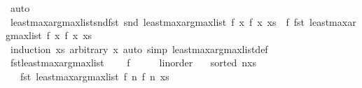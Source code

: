 \begin{isabellebody}
\isamarkupfalse%
\ auto%
\endisatagproof
{\isafoldproof}%
%
\isadelimproof
\isanewline
%
\endisadelimproof
\isanewline
{}\isamarkupfalse%
\ least{\isacharunderscore}{\kern0pt}max{\isacharunderscore}{\kern0pt}arg{\isacharunderscore}{\kern0pt}max{\isacharunderscore}{\kern0pt}list{\isacharunderscore}{\kern0pt}snd{\isacharunderscore}{\kern0pt}fst{\isacharcolon}{\kern0pt}\ {\isachardoublequoteopen}snd\ {\isacharparenleft}{\kern0pt}least{\isacharunderscore}{\kern0pt}max{\isacharunderscore}{\kern0pt}arg{\isacharunderscore}{\kern0pt}max{\isacharunderscore}{\kern0pt}list\ f\ {\isacharparenleft}{\kern0pt}x{\isacharcomma}{\kern0pt}\ f\ x{\isacharparenright}{\kern0pt}\ xs{\isacharparenright}{\kern0pt}\ {\isacharequal}{\kern0pt}\ f\ {\isacharparenleft}{\kern0pt}fst\ {\isacharparenleft}{\kern0pt}least{\isacharunderscore}{\kern0pt}max{\isacharunderscore}{\kern0pt}arg{\isacharunderscore}{\kern0pt}max{\isacharunderscore}{\kern0pt}list\ f\ {\isacharparenleft}{\kern0pt}x{\isacharcomma}{\kern0pt}\ f\ x{\isacharparenright}{\kern0pt}\ xs{\isacharparenright}{\kern0pt}{\isacharparenright}{\kern0pt}{\isachardoublequoteclose}\isanewline
%
\isadelimproof
\ \ %
\endisadelimproof
%
\isatagproof
{}\isamarkupfalse%
\ {\isacharparenleft}{\kern0pt}induction\ xs\ arbitrary{\isacharcolon}{\kern0pt}\ x{\isacharparenright}{\kern0pt}\ {\isacharparenleft}{\kern0pt}auto\ simp{\isacharcolon}{\kern0pt}\ least{\isacharunderscore}{\kern0pt}max{\isacharunderscore}{\kern0pt}arg{\isacharunderscore}{\kern0pt}max{\isacharunderscore}{\kern0pt}list{\isacharunderscore}{\kern0pt}def{\isacharparenright}{\kern0pt}%
\endisatagproof
{\isafoldproof}%
%
\isadelimproof
\isanewline
%
\endisadelimproof
\isanewline
{}\isamarkupfalse%
\ fst{\isacharunderscore}{\kern0pt}least{\isacharunderscore}{\kern0pt}max{\isacharunderscore}{\kern0pt}arg{\isacharunderscore}{\kern0pt}max{\isacharunderscore}{\kern0pt}list{\isacharcolon}{\kern0pt}\ \isanewline
\ \ \ f\ {\isacharcolon}{\kern0pt}{\isacharcolon}{\kern0pt}\ {\isachardoublequoteopen}{\isacharunderscore}{\kern0pt}\ {\isasymRightarrow}\ {\isacharunderscore}{\kern0pt}\ {\isacharcolon}{\kern0pt}{\isacharcolon}{\kern0pt}\ linorder{\isachardoublequoteclose}\isanewline
\ \ \ {\isachardoublequoteopen}sorted\ {\isacharparenleft}{\kern0pt}n{\isacharhash}{\kern0pt}xs{\isacharparenright}{\kern0pt}{\isachardoublequoteclose}\isanewline
\ \ \ {\isachardoublequoteopen}fst\ {\isacharparenleft}{\kern0pt}least{\isacharunderscore}{\kern0pt}max{\isacharunderscore}{\kern0pt}arg{\isacharunderscore}{\kern0pt}max{\isacharunderscore}{\kern0pt}list\ f\ {\isacharparenleft}{\kern0pt}n{\isacharcomma}{\kern0pt}\ f\ n{\isacharparenright}{\kern0pt}\ xs{\isacharparenright}{\kern0pt}\ \isanewline

\end{isabellebody}
